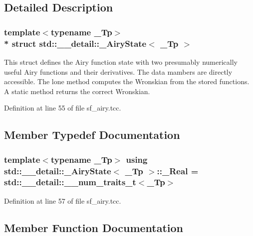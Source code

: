 \subsection{Detailed Description}
\subsubsection*{template$<$typename \+\_\+\+Tp$>$\\*
struct std\+::\+\_\+\+\_\+detail\+::\+\_\+\+Airy\+State$<$ \+\_\+\+Tp $>$}

This struct defines the Airy function state with two presumably numerically useful Airy functions and their derivatives. The data mambers are directly accessible. The lone method computes the Wronskian from the stored functions. A static method returns the correct Wronskian. 

Definition at line 55 of file sf\+\_\+airy.\+tcc.



\subsection{Member Typedef Documentation}
\subsubsection[{\texorpdfstring{\+\_\+\+Real}{_Real}}]{\setlength{\rightskip}{0pt plus 5cm}template$<$typename \+\_\+\+Tp$>$ using {\bf std\+::\+\_\+\+\_\+detail\+::\+\_\+\+Airy\+State}$<$ \+\_\+\+Tp $>$\+::{\bf \+\_\+\+Real} =  std\+::\+\_\+\+\_\+detail\+::\+\_\+\+\_\+num\+\_\+traits\+\_\+t$<$\+\_\+\+Tp$>$}\hypertarget{structstd_1_1____detail_1_1__AiryState_a8fc5c7c19e6dd8f25f1e4103f74c0a3b}{}\label{structstd_1_1____detail_1_1__AiryState_a8fc5c7c19e6dd8f25f1e4103f74c0a3b}


Definition at line 57 of file sf\+\_\+airy.\+tcc.



\subsection{Member Function Documentation}
